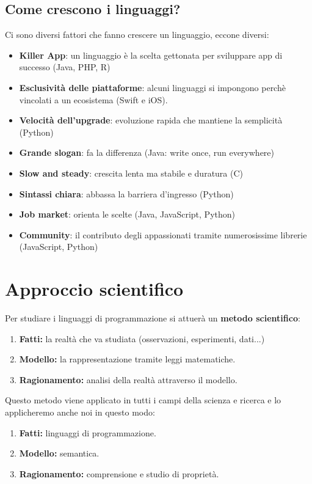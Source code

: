 \documentclass[12pt,a4paper]{article}
\let\oldsection\section
\renewcommand{\section}{\clearpage\oldsection}
\begin{document}
\subsection{Come crescono i linguaggi?}
Ci sono diversi fattori che fanno crescere un linguaggio, eccone diversi:
\begin{itemize}
  \item \textbf{Killer App}: un linguaggio è la scelta gettonata per sviluppare app di successo (Java, PHP, R)
  \item \textbf{Esclusività delle piattaforme}: alcuni linguaggi si impongono perchè vincolati a un ecosistema (Swift e iOS).
  \item \textbf{Velocità dell'upgrade}: evoluzione rapida che mantiene la semplicità (Python)
  \item \textbf{Grande slogan}: fa la differenza (Java: write once, run everywhere)
  \item \textbf{Slow and steady}: crescita lenta ma stabile e duratura (C)
  \item \textbf{Sintassi chiara}: abbassa la barriera d'ingresso (Python)
  \item \textbf{Job market}: orienta le scelte (Java, JavaScript, Python)
  \item \textbf{Community}: il contributo degli appassionati tramite numerosissime librerie (JavaScript, Python)
\end{itemize}

\section{Approccio scientifico}
Per studiare i linguaggi di programmazione si attuerà un \textbf{metodo scientifico}:
\begin{enumerate}
  \item \textbf{Fatti:} la realtà che va studiata (osservazioni, esperimenti, dati...)
  \item \textbf{Modello:} la rappresentazione tramite leggi matematiche.
  \item \textbf{Ragionamento:} analisi della realtà attraverso il modello.
\end{enumerate}
Questo metodo viene applicato in tutti i campi della scienza e ricerca e lo applicheremo anche noi in questo modo:
\begin{enumerate}
  \item \textbf{Fatti:} linguaggi di programmazione.
  \item \textbf{Modello:} semantica.
  \item \textbf{Ragionamento:} comprensione e studio di proprietà.
\end{enumerate}
\end{document}
